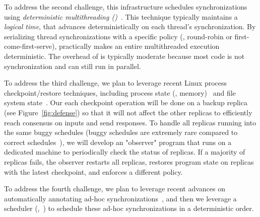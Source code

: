 To address the second challenge, this infrastructure schedules synchronizations 
using \emph{deterministic 
multithreading (\dmt)}~\cite{dpj:oopsla09,dmp:asplos09,kendo:asplos09,
coredet:asplos10, 
dos:osdi10,ddos:asplos13,ics:oopsla13}.  This technique typically maintains a 
\emph{logical time}, that advances deterministically on each thread's 
synchronization. By serializing thread synchronizations with a specific policy 
(\eg, round-robin or first-come-first-serve), \dmt practically makes an entire 
multithreaded execution deterministic. The overhead of \dmt is typically 
moderate because most code is not synchronization and can still run in parallel.



To address the third challenge, we plan to leverage recent 
Linux process checkpoint/restore techniques, including process state (\eg, 
memory)~\cite{criu} and file system state~\cite{lxc}. Our each 
checkpoint operation will be done on a backup replica (see 
Figure~\ref{fig:defense}) so that it will not affect the other replicas to 
efficiently reach consensus on inputs and send responses. To handle all replicas 
running into the same buggy schedules (buggy schedules are extremely rare 
compared to correct schedules~\cite{lu:concurrency-bugs}), we will develop an 
"observer" program that runs on a dedicated machine to periodically check the 
status of replicas. If a majority of replicas fails, the observer restarts all 
replicas, restores program state on replicas with the latest checkpoint, and 
enforces a different \dmt policy.

To address the fourth challenge, we plan to leverage recent advances on 
automatically annotating ad-hoc synchronizations~\cite{syncfinder:osdi10, 
cfix:osdi12}, and then we leverage a \dmt scheduler (\eg,~\cite{dthreads:sosp11, 
parrot:sosp13}) to schedule these ad-hoc synchronizations in a deterministic 
order.






